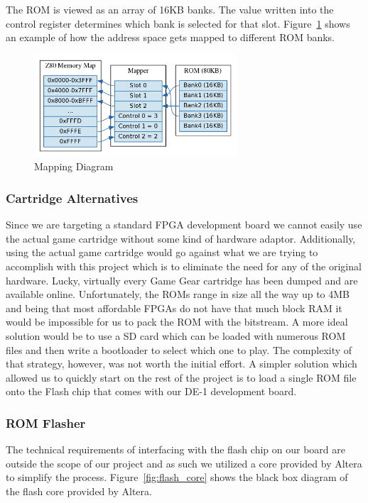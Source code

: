 \documentclass{article}
\begin{document}
The ROM is viewed as an array of 16KB banks. The value written into the control
register determines which bank is selected for that slot.
Figure~\ref{fig:mapping_diagram} shows an example of how the address space gets
mapped to different ROM banks.

\begin{figure}[H]
\centering
\includegraphics[height=1.5in]{../images/mapper.png}
\caption{Mapping Diagram}
\label{fig:mapping_diagram}
\end{figure}

\subsubsection{Cartridge Alternatives}
Since we are targeting a standard FPGA development board we cannot easily use
the actual game cartridge without some kind of hardware adaptor.  Additionally,
using the actual game cartridge would go against what we are trying to
accomplish with this project which is to eliminate the need for any of the
original hardware. Lucky, virtually every Game Gear cartridge has been dumped
and are available online.  Unfortunately, the ROMs range in size all the way up
to 4MB and being that most affordable FPGAs do not have that much block RAM it
would be impossible for us to pack the ROM with the bitstream. A more ideal
solution would be to use a SD card which can be loaded with numerous ROM files
and then write a bootloader to select which one to play.  The complexity of
that strategy, however, was not worth the initial effort. A simpler solution
which allowed us to quickly start on the rest of the project is to load a
single ROM file onto the Flash chip that comes with our DE-1 development board.

\subsubsection{ROM Flasher}
The technical requirements of interfacing with the flash chip on our board are
outside the scope of our project and as such we utilized a core provided by
Altera \cite{flash_core} to simplify the process.  Figure~\ref{fig:flash_core}
shows the black box diagram of the flash core provided by Altera.
\end{document}
